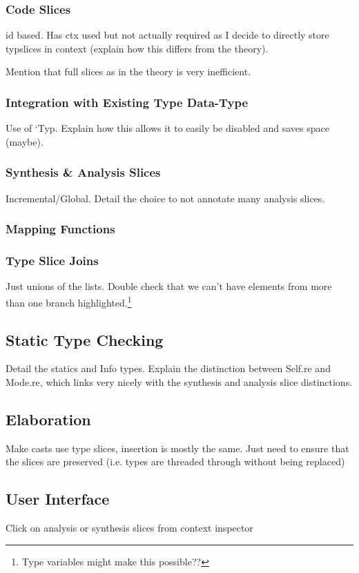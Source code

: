\subsubsection{Code Slices}\label{sec:CodeSlices}
id based. Has ctx used but not actually required as I decide to directly store typslices in context (explain how this differs from the theory).

Mention that full slices as in the theory is very inefficient.
\subsubsection{Integration with Existing Type Data-Type}
Use of `Typ. Explain how this allows it to easily be disabled and saves space (maybe).
\subsubsection{Synthesis \& Analysis Slices}
Incremental/Global. Detail the choice to not annotate many analysis slices.
\subsubsection{Mapping Functions}
\subsubsection{Type Slice Joins}
Just unions of the lists. Double check that we can't have elements from more than one branch highlighted.\footnote{Type variables might make this possible??}

\subsection{Static Type Checking}\label{sec:TypeChecking}
Detail the statics and Info types. Explain the distinction between Self.re and Mode.re, which links very nicely with the synthesis and analysis slice distinctions.

\subsection{Elaboration}\label{sec:Elaboration}
Make casts use type slices, insertion is mostly the same. Just need to ensure that the slices are preserved (i.e. types are threaded through without being replaced)

\subsection{User Interface}
Click on analysis or synthesis slices from context inspector


